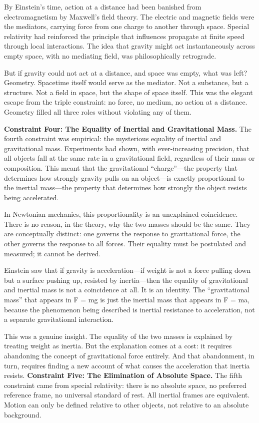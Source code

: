 \documentclass[11pt]{article}
\begin{document}
By Einstein's time, action at a distance had been banished from electromagnetism by Maxwell's field theory. The electric and magnetic fields were the mediators, carrying force from one charge to another through space. Special relativity had reinforced the principle that influences propagate at finite speed through local interactions. The idea that gravity might act instantaneously across empty space, with no mediating field, was philosophically retrograde.

But if gravity could not act at a distance, and space was empty, what was left? Geometry. Spacetime itself would serve as the mediator. Not a substance, but a structure. Not a field in space, but the shape of space itself. This was the elegant escape from the triple constraint: no force, no medium, no action at a distance. Geometry filled all three roles without violating any of them.

\textbf{Constraint Four: The Equality of Inertial and Gravitational Mass.} The fourth constraint was empirical: the mysterious equality of inertial and gravitational mass. Experiments had shown, with ever-increasing precision, that all objects fall at the same rate in a gravitational field, regardless of their mass or composition. This meant that the gravitational ``charge''---the property that determines how strongly gravity pulls on an object---is exactly proportional to the inertial mass---the property that determines how strongly the object resists being accelerated.

In Newtonian mechanics, this proportionality is an unexplained coincidence. There is no reason, in the theory, why the two masses should be the same. They are conceptually distinct: one governs the response to gravitational force, the other governs the response to all forces. Their equality must be postulated and measured; it cannot be derived.

Einstein saw that if gravity is acceleration---if weight is not a force pulling down but a surface pushing up, resisted by inertia---then the equality of gravitational and inertial mass is not a coincidence at all. It is an identity. The ``gravitational mass'' that appears in F = mg is just the inertial mass that appears in F = ma, because the phenomenon being described is inertial resistance to acceleration, not a separate gravitational interaction.

This was a genuine insight. The equality of the two masses is explained by treating weight as inertia. But the explanation comes at a cost: it requires abandoning the concept of gravitational force entirely. And that abandonment, in turn, requires finding a new account of what causes the acceleration that inertia resists. \textbf{Constraint Five: The Elimination of Absolute Space.} The fifth constraint came from special relativity: there is no absolute space, no preferred reference frame, no universal standard of rest. All inertial frames are equivalent. Motion can only be defined relative to other objects, not relative to an absolute background.
\end{document}
